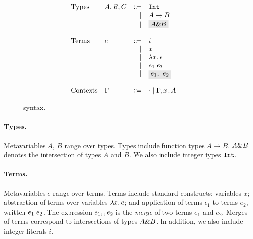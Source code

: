 \begin{figure}[t]
  \[
    \begin{array}{l}
      \begin{array}{llrll}
        \text{Types}
        & A, B, C & \Coloneqq & \code{Int} & \\
        &         & \mid      & A \to B    & \\
        &         & \mid      & \highlight{$A \inter B$}  & \\

        \\
        \text{Terms}
        & e & \Coloneqq & i            & \\
        &   & \mid & x                 & \\
        &   & \mid & \lamty x A e      & \\
        &   & \mid & \app {e_1} {e_2}  & \\
        &   & \mid & \highlight{$e_1 \mergeop e_2$}  & \\

        \\
        \text{Contexts}
        & \Gamma & \Coloneqq & \cdot
                   \mid \Gamma, x \oftype A  & \\
      \end{array}
    \end{array}
  \]

  \caption{\name syntax.}
  \label{fig:fi-syntax}
\end{figure}

\paragraph{Types.} Metavariables $A$, $B$ range over types. Types include
function types $A \to B$. $A \inter B$ denotes the intersection of types $A$ and
$B$. We also include integer types $\code{Int}$.

\paragraph{Terms.} Metavariables $e$ range over terms.  Terms include standard
constructs: variables $x$; abstraction of terms over variables
$\lamty x A e$; and application of terms $e_1$ to terms $e_2$, written $\app
{e_1} {e_2}$. The expression $e_1 \mergeop e_2$ is the \emph{merge} of two terms
$e_1$ and $e_2$. Merges of terms correspond to intersections of types $A \inter
B$. 
In addition, we also include integer literals $i$.

